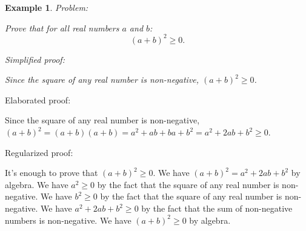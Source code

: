 \documentclass{article}
\newtheorem{example}{Example}
\begin{document}



\begin{example}
Problem:
\begin{tcolorbox}[colback=yellow!10, width=\linewidth]
Prove that for all real numbers $a$ and $b$:
    $$(a+b)^2 \geq 0.$$
\end{tcolorbox}

Simplified proof:
\begin{tcolorbox}[colback=blue!10, width=\linewidth]
Since the square of any real number is non-negative, $(a+b)^2 \ge 0$.
\end{tcolorbox}
\end{example}

Elaborated proof:
\begin{tcolorbox}[colback=green!10, width=\linewidth]
Since the square of any real number is non-negative, $(a+b)^2 = (a+b)(a+b) = a^2 + ab + ba + b^2 = a^2 + 2ab + b^2 \ge 0$.
\end{tcolorbox}

Regularized proof:
\begin{tcolorbox}[colback=red!10, width=\linewidth]
It's enough to prove that $(a+b)^2 \geq 0$. We have $(a+b)^2 = a^2 + 2ab + b^2$ by algebra. We have $a^2 \ge 0$ by the fact that the square of any real number is non-negative. We have $b^2 \ge 0$ by the fact that the square of any real number is non-negative. We have $a^2 + 2ab + b^2 \ge 0$ by the fact that the sum of non-negative numbers is non-negative. We have $(a+b)^2 \geq 0$ by algebra.
\end{tcolorbox}
\end{document}
